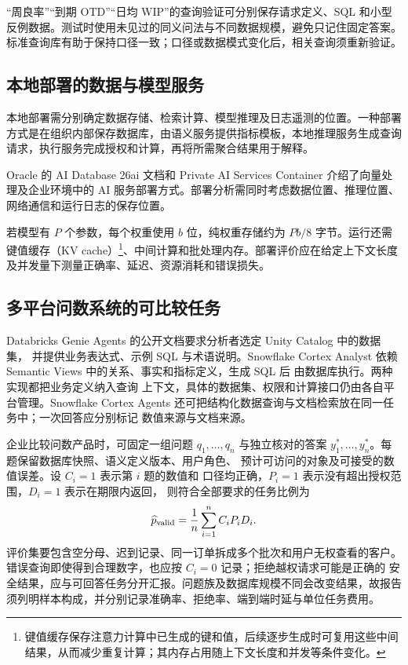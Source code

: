 “周良率”“到期 OTD”“日均 WIP”的查询验证可分别保存请求定义、SQL 和小型反例数据。测试时使用未见过的同义问法与不同数据规模，避免只记住固定答案。标准查询库有助于保持口径一致；口径或数据模式变化后，相关查询须重新验证。

\subsection{本地部署的数据与模型服务}

本地部署需分别确定数据存储、检索计算、模型推理及日志遥测的位置。一种部署方式是在组织内部保存数据库，由语义服务提供指标模板，本地推理服务生成查询请求，执行服务完成授权和计算，再将所需聚合结果用于解释。

Oracle 的 AI Database 26ai 文档和 Private AI Services Container 介绍了向量处理及企业环境中的 AI 服务部署方式\cite{oracle03,oracle10}。部署分析需同时考虑数据位置、推理位置、网络通信和运行日志的保存位置。

若模型有 \(P\) 个参数，每个权重使用 \(b\) 位，纯权重存储约为 \(Pb/8\) 字节。运行还需键值缓存（KV cache）\footnote{键值缓存保存注意力计算中已生成的键和值，后续逐步生成时可复用这些中间结果，从而减少重复计算；其内存占用随上下文长度和并发等条件变化。}、中间计算和批处理内存。部署评价应在给定上下文长度及并发量下测量正确率、延迟、资源消耗和错误损失。

\subsection{多平台问数系统的可比较任务}
Databricks Genie Agents 的公开文档要求分析者选定 Unity Catalog 中的数据集，
并提供业务表达式、示例 SQL 与术语说明\cite{databricksGenie2026}。Snowflake
Cortex Analyst 依赖 Semantic Views 中的关系、事实和指标定义，生成 SQL 后
由数据库执行\cite{snowflakeSemantic2026}。两种实现都把业务定义纳入查询
上下文，具体的数据集、权限和计算接口仍由各自平台管理。Snowflake Cortex
Agents 还可把结构化数据查询与文档检索放在同一任务中；一次回答应分别标记
数值来源与文档来源\cite{snowflakeAgents2026}。

企业比较问数产品时，可固定一组问题 \(q_1,\ldots,q_n\) 与独立核对的答案
\(y_1^*,\ldots,y_n^*\)。每题保留数据库快照、语义定义版本、用户角色、
预计可访问的对象及可接受的数值误差。设 \(C_i=1\) 表示第 \(i\) 题的数值和
口径均正确，\(P_i=1\) 表示没有超出授权范围，\(D_i=1\) 表示在期限内返回，
则符合全部要求的任务比例为
\[
  \widehat p_{\rm valid}=\frac1n\sum_{i=1}^{n} C_iP_iD_i.
\]
评价集要包含空分母、迟到记录、同一订单拆成多个批次和用户无权查看的客户。
错误查询即使得到合理数字，也应按 \(C_i=0\) 记录；拒绝越权请求可能是正确的
安全结果，应与可回答任务分开汇报。问题族及数据库规模不同会改变结果，故报告
须列明样本构成，并分别记录准确率、拒绝率、端到端时延与单位任务费用。

